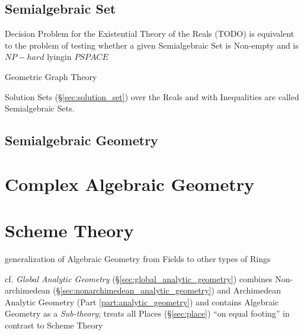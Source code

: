 \subsection{Semialgebraic Set}\label{sec:semialgebraic_set}

Decision Problem for the Existential Theory of the Reals (TODO) is equivalent
to the problem of testing whether a given Semialgebraic Set is Non-empty and is
$NP-hard$ lyingin $PSPACE$

Geometric Graph Theory

Solution Sets (\S\ref{sec:solution_set}) over the Reals and with Inequalities
are called Semialgebraic Sets.



\subsection{Semialgebraic Geometry}\label{sec:semialgebraic_geometry}



\section{Complex Algebraic Geometry}
\label{sec:complex_algebraic_geometry}

\section{Scheme Theory}\label{sec:scheme_theory}

generalization of Algebraic Geometry from Fields to other types of Rings

\fist cf. \emph{Global Analytic Geometry} (\S\ref{sec:global_analytic_geometry})
combines Non-archimedean (\S\ref{sec:nonarchimedean_analytic_geometry}) and
Archimedean Analytic Geometry (Part \ref{part:analytic_geometry}) and contains
Algebraic Geometry as a \emph{Sub-theory}; treats all Places
(\S\ref{sec:place}) ``on equal footing'' in contrast to Scheme Theory

